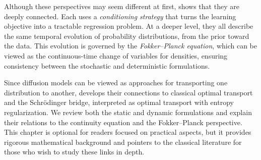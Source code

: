 Although these perspectives may seem different at first,  shows that they are deeply connected. 
Each uses a \emph{conditioning strategy} that turns the learning objective into a tractable regression problem. 
At a deeper level, they all describe the same temporal evolution of probability distributions, from the prior toward the data. 
This evolution is governed by the \emph{Fokker–Planck equation}, which can be viewed as the continuous-time change of variables for densities, ensuring consistency between the stochastic and deterministic formulations.

Since diffusion models can be viewed as approaches for transporting one distribution to another,  develops their connections to classical optimal transport and the Schrödinger bridge, interpreted as optimal transport with entropy regularization. We review both the static and dynamic formulations and explain their relations to the continuity equation and the Fokker--Planck perspective. This chapter is optional for readers focused on practical aspects, but it provides rigorous mathematical background and pointers to the classical literature for those who wish to study these links in depth. 


